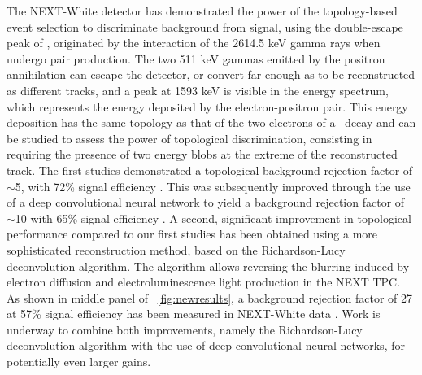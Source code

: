 The NEXT-White detector has demonstrated the power of the topology-based event selection to discriminate background from signal, using the double-escape peak of , originated by the interaction of the 2614.5 keV gamma rays when undergo pair production. The two 511 keV gammas emitted by the positron annihilation can escape the detector, or convert far enough as to be reconstructed as different tracks, and a peak at 1593 keV is visible in the energy spectrum, which represents the energy deposited by the electron-positron pair.  This energy deposition has the same topology as that of the two electrons of a \bbonu ~decay and can be studied to assess the power of topological discrimination, consisting in requiring the presence of two energy blobs at the extreme of the reconstructed track.  The first studies demonstrated a topological background rejection factor of $\sim$5, with 72\% signal efficiency \cite{Ferrario:2019kwg}. This was subsequently improved through the use of a deep convolutional neural network to yield a background rejection factor of  $\sim$10 with 65\% signal efficiency \cite{NEXT:2020jmz}. A second, significant improvement in topological performance compared to our first studies has been obtained using a more sophisticated reconstruction method, based on the Richardson-Lucy deconvolution algorithm. The algorithm allows reversing the blurring induced by electron diffusion and electroluminescence light production in the NEXT TPC. As shown in middle panel of \fig\ \ref{fig:newresults}, a  background rejection factor of 27 at 57\% signal efficiency has been measured in NEXT-White data \cite{NEXT:2021pjq}. Work is underway to combine both improvements, namely the Richardson-Lucy deconvolution algorithm with the use of deep convolutional neural networks, for potentially even larger gains.




